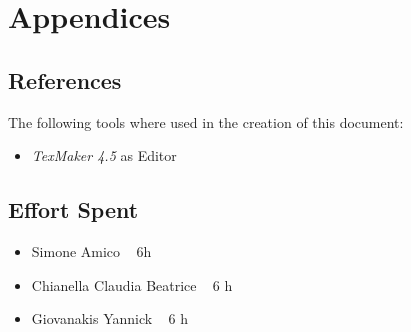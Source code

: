 \documentclass[12pt]{article}
\begin{document}
	
	
			
	\section{Appendices}
		\subsection{References}
		The following tools where used in the creation of this document:
		\begin{itemize}
		\item \emph{TexMaker 4.5} as Editor
		
		\end{itemize}
		
		\subsection{Effort Spent}
		\begin{itemize}
		\item Simone Amico ~  6h
		\item Chianella Claudia Beatrice ~ 6 h
		\item Giovanakis Yannick ~ 6 h
		\end{itemize}

	 
	
\end{document}
